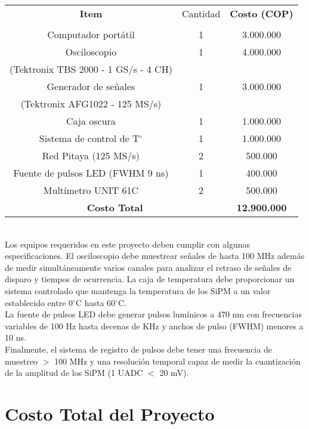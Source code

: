 \begin{tabular}{|c|c|c|}\hline
{\bf Item} 	& Cantidad & {\bf Costo (COP)} \\
		   & & \\\hline
Computador portátil	    &  1 & 3.000.000 	\\\hline
Osciloscopio    &  1 & 4.000.000 	\\
(Tektronix TBS 2000 - 1 GS/s - 4 CH) & & \\\hline
Generador de señales 	&  1 & 3.000.000 	\\
(Tektronix AFG1022 -  125 MS/s)	&   & 	\\\hline
Caja oscura	            &  1 & 1.000.000 	\\\hline
Sistema de control de T$^{\circ}$	&  1 & 1.000.000 	\\\hline
Red Pitaya (125 MS/s)              &  2 & 500.000 	\\\hline
Fuente de pulsos LED (FWHM 9 ns)              & 1 & 400.000 	\\\hline
Multímetro UNIT 61C            &  2 & 500.000 	\\\hline
\multicolumn{2}{|c|}{\bf Costo Total} 						          & {\bf 12.900.000}					\\\hline
\end{tabular}\\

Los equipos requeridos en este proyecto deben cumplir con algunas especificaciones. El osciloscopio debe muestrear señales de hasta 100 MHz además de medir simultáneamente varios canales para analizar el retraso de señales de disparo y tiempos de ocurrencia. La caja de temperatura debe proporcionar un sistema controlado que mantenga la temperatura de los SiPM a un valor establecido entre 0$^{\circ}$C hasta 60$^{\circ}$C.\\

La fuente de pulsos LED debe generar pulsos lumínicos a 470 nm con frecuencias variables de 100 Hz hasta decenas de KHz y anchos de pulso (FWHM) menores a 10 ns. \\

Finalmente, el sistema de registro de pulsos debe tener una frecuencia de muestreo $>$ 100 MHz y una resolución temporal capaz de medir la cuantización de la amplitud de los SiPM (1 UADC $<$ 20 mV). 

\section{Costo Total del Proyecto}

